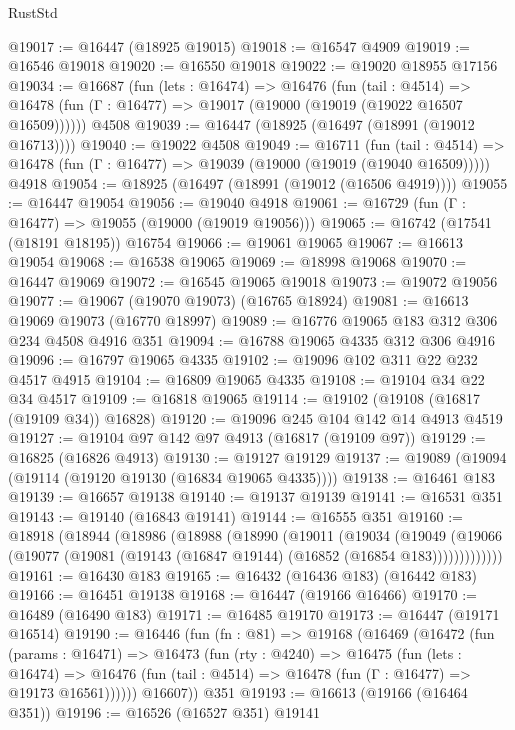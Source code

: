 \begin{lexlean}{RustStd}
\begin{coremodule}
@19017 := @16447 (@18925 @19015)
@19018 := @16547 @4909
@19019 := @16546 @19018
@19020 := @16550 @19018
@19022 := @19020 @18955 @17156
@19034 := @16687
    (fun (lets : @16474) =>
    @16476
      (fun (tail : @4514) =>
      @16478 (fun (Γ : @16477) => @19017 (@19000 (@19019 (@19022 @16507 @16509))))))
    @4508
@19039 := @16447 (@18925 (@16497 (@18991 (@19012 @16713))))
@19040 := @19022 @4508
@19049 := @16711
    (fun (tail : @4514) => @16478 (fun (Γ : @16477) => @19039 (@19000 (@19019 (@19040 @16509)))))
    @4918
@19054 := @18925 (@16497 (@18991 (@19012 (@16506 @4919))))
@19055 := @16447 @19054
@19056 := @19040 @4918
@19061 := @16729 (fun (Γ : @16477) => @19055 (@19000 (@19019 @19056)))
@19065 := @16742 (@17541 (@18191 @18195)) @16754
@19066 := @19061 @19065
@19067 := @16613 @19054
@19068 := @16538 @19065
@19069 := @18998 @19068
@19070 := @16447 @19069
@19072 := @16545 @19065 @19018
@19073 := @19072 @19056
@19077 := @19067 (@19070 @19073) (@16765 @18924)
@19081 := @16613 @19069 @19073 (@16770 @18997)
@19089 := @16776 @19065 @183 @312 @306 @234 @4508 @4916 @351
@19094 := @16788 @19065 @4335 @312 @306 @4916
@19096 := @16797 @19065 @4335
@19102 := @19096 @102 @311 @22 @232 @4517 @4915
@19104 := @16809 @19065 @4335
@19108 := @19104 @34 @22 @34 @4517
@19109 := @16818 @19065
@19114 := @19102 (@19108 (@16817 (@19109 @34)) @16828)
@19120 := @19096 @245 @104 @142 @14 @4913 @4519
@19127 := @19104 @97 @142 @97 @4913 (@16817 (@19109 @97))
@19129 := @16825 (@16826 @4913)
@19130 := @19127 @19129
@19137 := @19089 (@19094 (@19114 (@19120 @19130 (@16834 @19065 @4335))))
@19138 := @16461 @183
@19139 := @16657 @19138
@19140 := @19137 @19139
@19141 := @16531 @351
@19143 := @19140 (@16843 @19141)
@19144 := @16555 @351
@19160 := @18918
    (@18944
      (@18986
        (@18988
          (@18990
            (@19011
              (@19034
                (@19049
                  (@19066 (@19077 (@19081 (@19143 (@16847 @19144) (@16852 (@16854 @183)))))))))))))
@19161 := @16430 @183
@19165 := @16432 (@16436 @183) (@16442 @183)
@19166 := @16451 @19138
@19168 := @16447 (@19166 @16466)
@19170 := @16489 (@16490 @183)
@19171 := @16485 @19170
@19173 := @16447 (@19171 @16514)
@19190 := @16446
    (fun (fn : @81) =>
    @19168
      (@16469
        (@16472
          (fun (params : @16471) =>
          @16473
            (fun (rty : @4240) =>
            @16475
              (fun (lets : @16474) =>
              @16476 (fun (tail : @4514) => @16478 (fun (Γ : @16477) => @19173 @16561))))))
        @16607))
    @351
@19193 := @16613 (@19166 (@16464 @351))
@19196 := @16526 (@16527 @351) @19141

\end{coremodule}
\end{lexlean}

